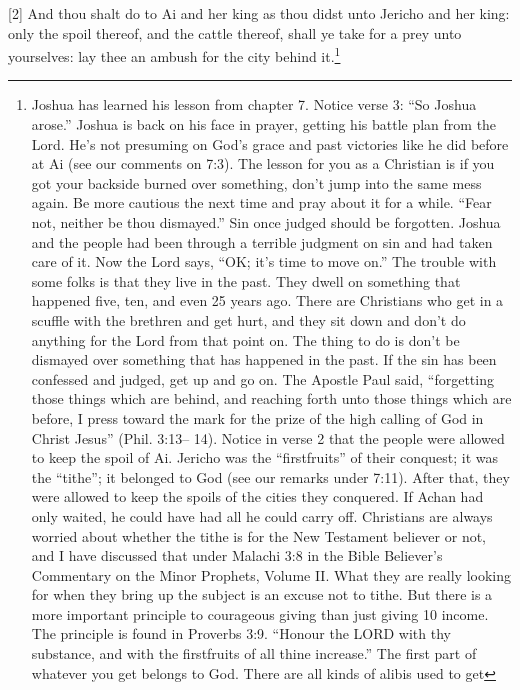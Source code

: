 






[2] \textcolor[rgb]{0.00,0.00,1.00}{And thou shalt do to Ai and her king as thou didst unto Jericho and her king: only the spoil thereof, and the cattle thereof, shall ye take for a prey unto yourselves: lay thee an ambush for the city behind it.}\footnote{Joshua has learned his lesson from chapter
7. Notice verse 3: “So Joshua arose.” Joshua
is back on his face in prayer, getting his battle
plan from the Lord. He’s not presuming on
God’s grace and past victories like he did before
at Ai (see our comments on 7:3). The lesson for
you as a Christian is if you got your backside
burned over something, don’t jump into the
same mess again. Be more cautious the next
time and pray about it for a while.
“Fear not, neither be thou dismayed.”
Sin once judged should be forgotten. Joshua
and the people had been through a terrible
judgment on sin and had taken care of it. Now
the Lord says, “OK; it’s time to move on.”
The trouble with some folks is that they live
in the past. They dwell on something that
happened five, ten, and even 25 years ago.
There are Christians who get in a scuffle with
the brethren and get hurt, and they sit down and
don’t do anything for the Lord from that point
on. The thing to do is don’t be dismayed over
something that has happened in the past. If the
sin has been confessed and judged, get up and
go on.
The Apostle Paul said, “forgetting those
things which are behind, and reaching forth
unto those things which are before, I press
toward the mark for the prize of the high
calling of God in Christ Jesus” (Phil. 3:13–
14).
Notice in verse 2 that the people were
allowed to keep the spoil of Ai. Jericho was the
“firstfruits” of their conquest; it was the “tithe”;
it belonged to God (see our remarks under
7:11). After that, they were allowed to keep the
spoils of the cities they conquered. If Achan
had only waited, he could have had all he could
carry off.
Christians are always worried about
whether the tithe is for the New Testament
believer or not, and I have discussed that under
Malachi 3:8 in the Bible Believer’s
Commentary on the Minor Prophets, Volume
II. What they are really looking for when they
bring up the subject is an excuse not to tithe.
But there is a more important principle to
courageous giving than just giving 10%
income. The principle is found in Proverbs 3:9.
“Honour the LORD with thy substance,
and with the firstfruits of all thine increase.”
The first part of whatever you get belongs
to God. There are all kinds of alibis used to get
}
